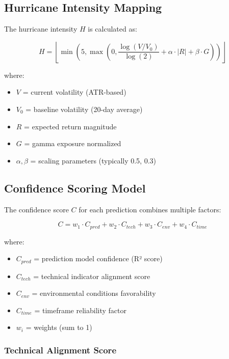 \documentclass[12pt,a4paper]{article}
\begin{document}
\subsection{Hurricane Intensity Mapping}

The hurricane intensity $H$ is calculated as:

\begin{equation}
H = \left\lfloor \min\left(5, \max\left(0, \frac{\log(V/V_0)}{\log(2)} + \alpha \cdot |R| + \beta \cdot G\right)\right) \right\rfloor
\end{equation}

where:
\begin{itemize}
    \item $V$ = current volatility (ATR-based)
    \item $V_0$ = baseline volatility (20-day average)
    \item $R$ = expected return magnitude
    \item $G$ = gamma exposure normalized
    \item $\alpha, \beta$ = scaling parameters (typically 0.5, 0.3)
\end{itemize}

\subsection{Confidence Scoring Model}

The confidence score $C$ for each prediction combines multiple factors:

\begin{equation}
C = w_1 \cdot C_{pred} + w_2 \cdot C_{tech} + w_3 \cdot C_{env} + w_4 \cdot C_{time}
\end{equation}

where:
\begin{itemize}
    \item $C_{pred}$ = prediction model confidence (R² score)
    \item $C_{tech}$ = technical indicator alignment score
    \item $C_{env}$ = environmental conditions favorability
    \item $C_{time}$ = timeframe reliability factor
    \item $w_i$ = weights (sum to 1)
\end{itemize}

\subsubsection{Technical Alignment Score}
\end{document}
